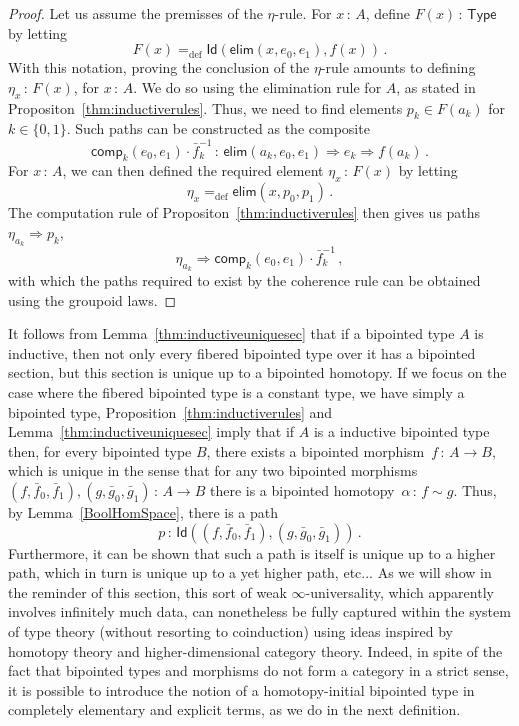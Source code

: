 \documentclass[10pt,a4paper,oneside,reqno]{amsart}
\theoremstyle{mythm}
\theoremstyle{mydef}
\theoremstyle{myrmk}
\newcommand{\ie}{\text{i.e.\ }}
\newcommand{\defeq}{=_{\mathrm{def}}}
\newcommand{\co}{\,{:}\,}
\newcommand{\type}{\mathsf{Type}}
\newcommand{\ct}{\cdot}
\newcommand{\Id}{\mathsf{Id}}
\newcommand{\elim}{\mathsf{elim}}
\newcommand{\comp}{\mathsf{comp}}
\begin{document}
\begin{proof} Let us assume the premisses of the $\eta$-rule. For $x \co A$, define $F(x) \co \type$  by letting~
\[
F(x) \defeq 
\Id( \elim(x, e_0, e_1), f(x)) \, .
\] 
With this notation, proving the conclusion of the $\eta$-rule amounts to defining
$\eta_x \co F(x)$, for $x \co A$. We do so using the elimination rule for $A$, as stated in Propositon~\ref{thm:inductiverules}.
Thus, we need to find elements $p_k \in F(a_k)$ for $k \in \{0, 1\}$. Such paths can be constructed as the composite
\[
\comp_k(e_0, e_1) \ct \bar{f}_k^{-1} \co  \elim(a_k, e_0, e_1) \Rightarrow e_k \Rightarrow f(a_k) \, .
\]
For $x \co A$, we can then defined the required element $\eta_x \co F(x)$ by letting 
\[
\eta_x \defeq \elim(x, p_0, p_1) \, . 
\]
The computation rule of Propositon~\ref{thm:inductiverules} then gives us paths $\eta_{a_k} \Rightarrow p_k$, \ie 
\[
\eta_{a_k} \Rightarrow \comp_k(e_0, e_1) \ct \bar{f}_k^{-1} \, , 
\]
with which the paths required to exist by the coherence rule can be obtained using the groupoid laws.
 \end{proof} 
 
 \medskip
 
 It follows from Lemma~\ref{thm:inductiveuniquesec} that if a bipointed type $A$ is inductive, then not only 
every fibered bipointed type over it has a bipointed section, but this section
is unique up to a bipointed homotopy. If we focus on the case where the fibered bipointed type is 
a constant type, \ie we have simply a bipointed type, 
 Proposition~\ref{thm:inductiverules} and Lemma~\ref{thm:inductiveuniquesec}
imply that if $A$ is a inductive bipointed type then, for every bipointed type $B$, 
there exists a bipointed morphism~$f \co A \to B$, which is unique in the sense that  for any two bipointed morphisms $(f, \bar{f}_0, \bar{f}_1), (g, \bar{g}_0, \bar{g}_1) \co A \to B$  there is a bipointed homotopy~$\alpha \co f \sim g$. Thus, by Lemma~\ref{BoolHomSpace}, there is a path 
\[
p \co \Id((f, \bar{f}_0, \bar{f}_1), (g, \bar{g}_0, \bar{g}_1)) \, .
\] 
Furthermore, it can be shown that such a path is itself is unique up to a higher path, which in turn is unique up to a yet higher path, etc... As we will show in the reminder of this section, this sort of weak $\infty$-universality, which apparently involves infinitely much data, can nonetheless be fully captured within the system of type theory (without resorting to coinduction) using ideas inspired by homotopy theory and higher-dimensional category theory. Indeed, in spite of the fact that bipointed types and morphisms do not form a category in a strict sense, it is possible to introduce the  notion of a homotopy-initial bipointed type in completely elementary and explicit terms, as we do in the next definition.
\end{document}
